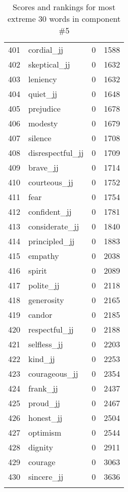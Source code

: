 \begin{longtable}[!htbp]{| rlr@{.}l |}
    401 & cordial\_jj & 0 & 1588 \\
    402 & skeptical\_jj & 0 & 1632 \\
    403 & leniency & 0 & 1632 \\
    404 & quiet\_jj & 0 & 1648 \\
    405 & prejudice & 0 & 1678 \\
    406 & modesty & 0 & 1679 \\
    407 & silence & 0 & 1708 \\
    408 & disrespectful\_jj & 0 & 1709 \\
    409 & brave\_jj & 0 & 1714 \\
    410 & courteous\_jj & 0 & 1752 \\
    411 & fear & 0 & 1754 \\
    412 & confident\_jj & 0 & 1781 \\
    413 & considerate\_jj & 0 & 1840 \\
    414 & principled\_jj & 0 & 1883 \\
    415 & empathy & 0 & 2038 \\
    416 & spirit & 0 & 2089 \\
    417 & polite\_jj & 0 & 2118 \\
    418 & generosity & 0 & 2165 \\
    419 & candor & 0 & 2185 \\
    420 & respectful\_jj & 0 & 2188 \\
    421 & selfless\_jj & 0 & 2203 \\
    422 & kind\_jj & 0 & 2253 \\
    423 & courageous\_jj & 0 & 2354 \\
    424 & frank\_jj & 0 & 2437 \\
    425 & proud\_jj & 0 & 2467 \\
    426 & honest\_jj & 0 & 2504 \\
    427 & optimism & 0 & 2544 \\
    428 & dignity & 0 & 2911 \\
    429 & courage & 0 & 3063 \\
    430 & sincere\_jj & 0 & 3636 \\
    \hline
    \caption{Scores and rankings for most extreme 30 words in component \#5} \\
\end{longtable}

